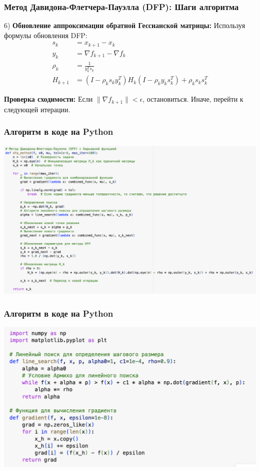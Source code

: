 \documentclass[12pt,pdf,hyperref={unicode}]{beamer}
\begin{document}
\begin{frame}
\frametitle{Метод Давидона-Флетчера-Пауэлла (DFP): Шаги алгоритма}
6) \textbf{Обновление аппроксимации обратной Гессианской матрицы:} Используя формулы обновления DFP:
    \begin{align*}
        s_k &= x_{k+1} - x_k \\
        y_k &= \nabla f_{k+1} - \nabla f_k \\
        \rho_k &= \frac{1}{y_k^T s_k} \\
H_{k+1} &= \left( I - \rho_k s_k y_k^T \right) H_k \left( I - \rho_k y_k s_k^T \right) + \rho_k s_k s_k^T
    \end{align*}
    
    \item \textbf{Проверка сходимости:} Если $\|\nabla f_{k+1}\| < \epsilon$, остановиться. Иначе, перейти к следующей итерации.
\end{frame}


\begin{frame}
\frametitle{Алгоритм в коде на Python}
\begin{center}
    \includegraphics[width=1\textwidth]{image1.png}
\end{center}
\end{frame}

\begin{frame}
\frametitle{Алгоритм в коде на Python}
\begin{center}
    \includegraphics[width=1\textwidth]{image2.png}
\end{center}
\end{frame}
\end{document}
